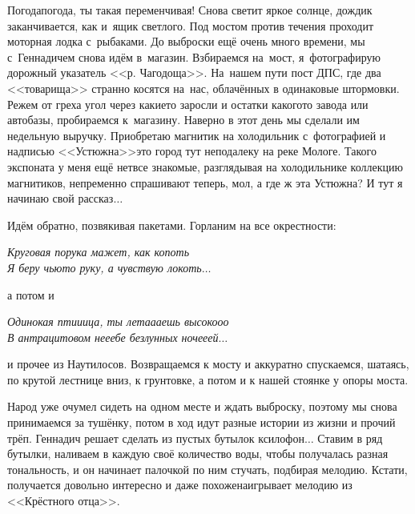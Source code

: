 Погода\sdash погода, ты такая переменчивая! Снова светит яркое солнце, дождик заканчивается, как и~ящик светлого. Под мостом против течения проходит моторная лодка с~рыбаками. До выброски ещё очень много времени, мы с~Геннадичем снова идём в~магазин.  Взбираемся на~мост, я~фотографирую дорожный указатель <<р. Чагодоща>>. На~нашем пути пост ДПС, где два <<товарища>> странно косятся на~нас, облачённых в одинаковые штормовки. Режем от греха угол через какие\sdash то заросли и остатки какого\sdash то завода или автобазы, пробираемся к~магазину. Наверно в этот день мы сделали им недельную выручку. Приобретаю магнитик на холодильник с~фотографией и надписью <<Устюжна>>\mdash это город тут неподалеку на реке Мологе. Такого экспоната у меня ещё нет\mdash все знакомые, разглядывая на холодильнике коллекцию магнитиков, непременно спрашивают теперь, мол, а где ж эта Устюжна? И тут я начинаю свой рассказ$\ldots$

Идём обратно, позвякивая пакетами. Горланим на все окрестности: 

\noindent\textit{%
	Круговая порука мажет, как копоть\mdash \\
	Я беру чью\sdash то руку, а чувствую локоть$\ldots$
}

\noindent а потом и 

\noindent\textit{%
	Одинокая пти\sdash и\sdash ица, ты лета\sdash а\sdash аешь высоко\sdash о\sdash о\\
	В антрацитовом не\sdash е\sdash ебе безлунных ноче\sdash е\sdash ей$\ldots$
}

\noindent и прочее из Наутилосов.
Возвращаемся к мосту и аккуратно спускаемся, шатаясь, по крутой лестнице вниз, к грунтовке, а потом и к нашей стоянке у опоры моста. 

Народ уже очумел сидеть на одном месте и ждать выброску, поэтому мы снова принимаемся за тушёнку, потом в ход идут разные истории из жизни и прочий трёп. Геннадич решает сделать из пустых бутылок ксилофон$\ldots$ Ставим в ряд бутылки, наливаем в каждую своё количество воды, чтобы получалась разная тональность, и он начинает палочкой по ним стучать, подбирая мелодию. Кстати, получается довольно интересно и даже похоже\mdash наигрывает мелодию из <<Крёстного отца>>. 

